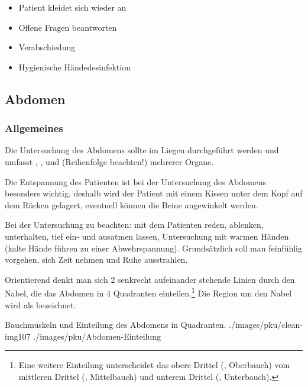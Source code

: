 {
\begin{itemize}
  \item Patient kleidet sich wieder an
  \item Offene Fragen beantworten
  \item Verabschiedung
  \item Hygienische Händedesinfektion
\end{itemize}
}
{}
{}
{}
{}


\bigskip
\subsection{\CO{[D1]} Abdomen}

\subsubsection{Allgemeines}

Die Untersuchung des Abdomens sollte im Liegen durchgeführt
werden und umfasst , ,
 und  (Reihenfolge beachten!)
mehrerer Organe.

Die Entspannung des Patienten ist bei der Untersuchung des
Abdomens besonders wichtig, deshalb wird der Patient mit
einem Kissen unter dem Kopf auf dem Rücken gelagert,
eventuell können die Beine angewinkelt werden.

Bei der Untersuchung zu beachten: mit dem Patienten reden,
ablenken, unterhalten, tief ein- und ausatmen lassen,
Untersuchung mit warmen Händen (kalte Hände führen zu einer
Abwehrspannung).
Grundsätzlich soll man feinfühlig vorgehen, sich Zeit nehmen
und Ruhe ausstrahlen.

{Orientierend denkt man sich 2 senkrecht aufeinander stehende Linien
durch den Nabel, die das Abdomen in 4 Quadranten
einteilen.\footnote{Eine weitere Einteilung unterscheidet
das obere Drittel (, Oberbauch) vom mittleren
Drittel (, Mittelbauch) und unterem Drittel (, Unterbauch).}
Die Region um den Nabel wird als 
bezeichnet.

}
{}
{}
{}
{}

\begin{PictureSeries}{}{Bauchmuskeln und Einteilung des Abdomens
in Quadranten. }
{./images/pku/clean-img107}
{}
{./images/pku/Abdomen-Einteilung}
{}
{}
{}
{}
{}
\end{PictureSeries}







